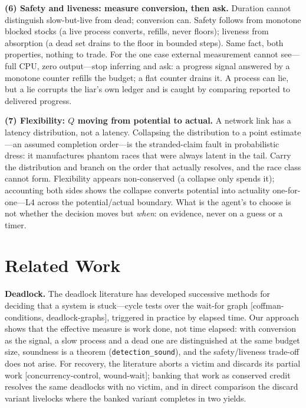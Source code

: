 \documentclass[11pt]{article}
\begin{document}
\textbf{(6) Safety and liveness: measure conversion, then ask.}
Duration cannot distinguish slow-but-live from dead; conversion can.
Safety follows from monotone blocked stocks (a live process converts,
refills, never floors); liveness from absorption (a dead set drains to
the floor in bounded steps). Same fact, both properties, nothing to
trade. For the one case external measurement cannot see---full CPU,
zero output---stop inferring and ask: a progress signal answered by a
monotone counter refills the budget; a flat counter drains it. A
process can lie, but a lie corrupts the liar's own ledger and is caught
by comparing reported to delivered progress.

\textbf{(7) Flexibility: $Q$ moving from potential to actual.} A
network link has a latency distribution, not a latency. Collapsing the
distribution to a point estimate---an assumed completion order---is the
stranded-claim fault in probabilistic dress: it manufactures phantom
races that were always latent in the tail. Carry the distribution and
branch on the order that actually resolves, and the race class cannot
form. Flexibility appears non-conserved (a collapse only spends it);
accounting both sides shows the collapse converts potential into
actuality one-for-one---L4 across the potential/actual boundary. What
is the agent's to choose is not whether the decision moves but
\emph{when}: on evidence, never on a guess or a timer.

\section{Related Work}
\label{sec:related}

\textbf{Deadlock.} The deadlock literature has developed successive
methods for deciding that a system is stuck---cycle tests over the
wait-for graph [coffman-conditions, deadlock-graphs], triggered in
practice by elapsed time. Our approach shows that the effective
measure is work done, not time elapsed: with conversion as the
signal, a slow process and a dead one are distinguished at the same
budget size, soundness is a theorem
(\texttt{detection\_sound}), and the safety/liveness trade-off does
not arise. For recovery, the literature aborts a victim and discards
its partial work [concurrency-control, wound-wait]; banking that work
as conserved credit resolves the same deadlocks with no victim, and
in direct comparison the discard variant livelocks where the banked
variant completes in two yields.
\end{document}
